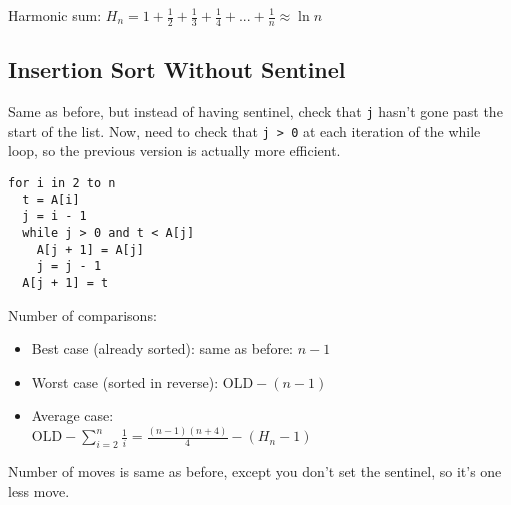 Harmonic sum: $\displaystyle H_n = 1 + \frac 1 2 + \frac 1 3 + \frac 1 4 + ... + \frac 1 n \approx \ln n$

\subsection{Insertion Sort Without Sentinel}

Same as before, but instead of having sentinel, check that \verb|j| hasn't gone past the start of the list. Now, need to check that \verb|j > 0| at each iteration of the while loop, so the previous version is actually more efficient.

\begin{verbatim}
for i in 2 to n
  t = A[i]
  j = i - 1
  while j > 0 and t < A[j]
    A[j + 1] = A[j]
    j = j - 1
  A[j + 1] = t
\end{verbatim}

Number of comparisons:
\begin{itemize}
    \item Best case (already sorted): same as before: $n - 1$
    \item Worst case (sorted in reverse): $\displaystyle \mathrm{OLD} - (n-1)$
    \item Average case:\\
$\displaystyle \mathrm{OLD} - \sum_{i=2}^n \frac 1 i = \frac{(n-1)(n+4)}{4} - (H_n - 1)$
\end{itemize}

Number of moves is same as before, except you don't set the sentinel, so it's one less move.

